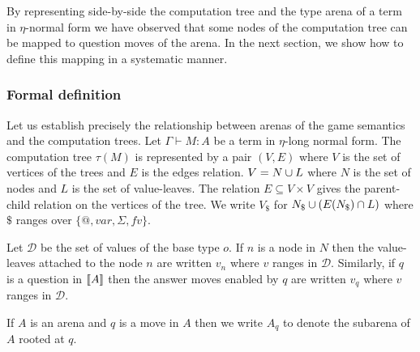 By representing side-by-side the computation tree and the type arena of a term in $\eta$-normal form we have observed
that some nodes of the computation tree can be mapped to question moves of the arena.
In the next section, we show how to define this mapping in a systematic manner.

\subsubsection{Formal definition}

Let us establish precisely the relationship between arenas of the
game semantics and the computation trees. Let $\Gamma \vdash M : A$
be a term in $\eta$-long normal form. The computation tree $\tau(M)$
is represented by a pair $(V,E)$ where $V$ is the set of vertices of
the trees and $E$ is the edges relation. $V = N \cup L$ where $N$
is the set of nodes and $L$ is the set of value-leaves.
The relation $E \subseteq V \times V$ gives the parent-child relation on the vertices of the tree.
We write $V_\$$ for $N_\$ \cup (E(N_\$) \cap L)$ where $\$$ ranges over $\{@, var, \Sigma, fv \}$.


Let $\mathcal{D}$ be the set of values of the base type $o$. If $n$ is a node in $N$ then the value-leaves attached to the node $n$ are written $v_n$ where $v$ ranges in $\mathcal{D}$.
Similarly, if $q$ is a question in ${[\![ A ]\!]}$ then the answer moves enabled by $q$ are written $v_q$ where $v$ ranges in $\mathcal{D}$.

If $A$ is an arena and $q$ is a move in $A$ then we write $A_q$ to
denote the subarena of $A$ rooted at $q$.


